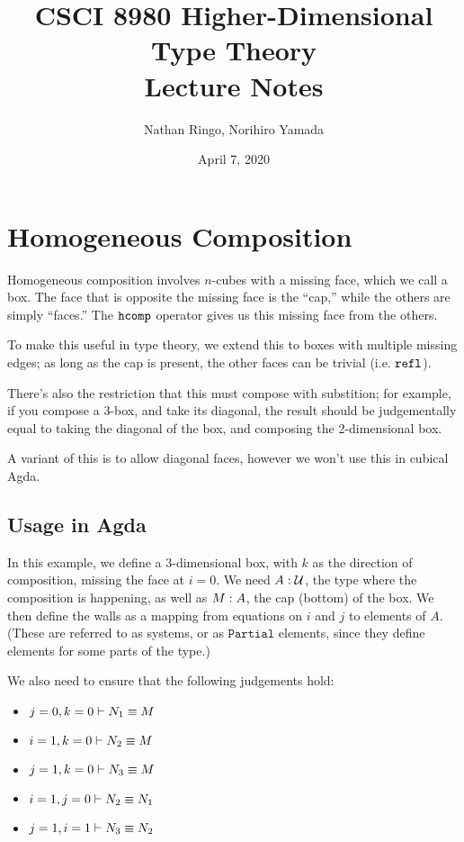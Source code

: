 \documentclass[11pt]{article}
\title{CSCI 8980 Higher-Dimensional Type Theory\\ Lecture Notes}
\author{Nathan Ringo, Norihiro Yamada}
\date{April 7, 2020} %
\begin{document}
\maketitle

\section{Homogeneous Composition}

Homogeneous composition involves $n$-cubes with a missing face, which we call a box. The face that is opposite the missing face is the ``cap,'' while the others are simply ``faces.'' The $\mathtt{hcomp}$ operator gives us this missing face from the others.

To make this useful in type theory, we extend this to boxes with multiple missing edges; as long as the cap is present, the other faces can be trivial (i.e. $\idrefl$).

There's also the restriction that this must compose with substition; for example, if you compose a 3-box, and take its diagonal, the result should be judgementally equal to taking the diagonal of the box, and composing the 2-dimensional box.

A variant of this is to allow diagonal faces, however we won't use this in cubical Agda.

\subsection{Usage in Agda}

In this example, we define a 3-dimensional box, with $k$ as the direction of composition, missing the face at $i=0$. We need $\oftype{A}{\univ}$, the type where the composition is happening, as well as $\oftype{M}{A}$, the cap (bottom) of the box. We then define the walls as a mapping from equations on $i$ and $j$ to elements of $A$. (These are referred to as systems, or as $\mathtt{Partial}$ elements, since they define elements for some parts of the type.)

We also need to ensure that the following judgements hold:
\begin{itemize}
	\item $\entails{j=0,k=0}{\eqtype{N_1}{M}}$
	\item $\entails{i=1,k=0}{\eqtype{N_2}{M}}$
	\item $\entails{j=1,k=0}{\eqtype{N_3}{M}}$
	\item $\entails{i=1,j=0}{\eqtype{N_2}{N_1}}$
	\item $\entails{j=1,i=1}{\eqtype{N_3}{N_2}}$
\end{itemize}
\end{document}
